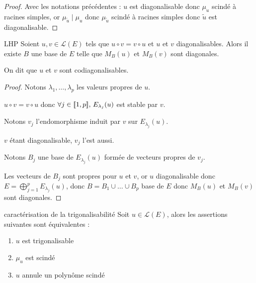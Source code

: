 \begin{proof}
    Avec les notations précédentes : $u$ est diagonalisable donc $\mu_u$
    scindé à racines simples, or $\mu_{\tilde u} \mid \mu_u$ donc $\mu_{\tilde u}$ 
    scindé à racines simples donc $\tilde u$ est diagonalisable.
\end{proof}

\begin{corollaire}{LHP}{}
    Soient $u, v \in \mathscr L(E)$ tels que $u \circ v = v \circ u$ et 
    $u$ et $v$ diagonalisables. Alors il existe $B$ une base de $E$ telle que 
    $M_B(u)$ et $M_B(v)$ sont diagonales.

    On dit que $u$ et $v$ sont codiagonalisables.
\end{corollaire}

\begin{proof}
    Notons $\lambda_1, \dots, \lambda_p$ les valeurs propres de $u$. 

    $u \circ v = v \circ u$ donc $\forall j \in [\![1, p]\!], \, E_{\lambda_j}(u)$ est stable par $v$.

    Notons $v_j$ l'endomorphisme induit par $v$ sur $E_{\lambda_j}(u)$.

    $v$ étant diagonalisable, $v_j$ l'est aussi. 

    Notons $B_j$ une base de $E_{\lambda_j}(u)$ formée de vecteurs propres de $v_j$.

    Les vecteurs de $B_j$ sont propres pour $u$ et $v$, or $u$ diagonalisable donc 
    $E = \displaystyle \bigoplus_{j = 1 }^{ p } E_{\lambda_j}(u)$, donc 
    $B = B_1 \cup \dots \cup B_p$ base de $E$ donc $M_B(u)$ et $M_B(v)$ sont diagonales.
\end{proof}

\begin{theoreme}{caractérisation de la trigonalisabilité}{}
    Soit $u \in \mathscr L(E)$, alors les assertions suivantes sont équivalentes :  
    \begin{enumerate}
        \item $u$ est trigonalisable
        \item $\mu_u$ est scindé
        \item $u$ annule un polynôme scindé
    \end{enumerate}
\end{theoreme}


